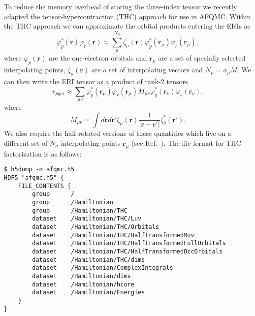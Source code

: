 To reduce the memory overhead of storing the three-index tensor we recently adapted the
tensor-hypercontraction\cite{HohensteinTHCI2012,ParrishTHCII2012,HohensteinTHCIII2012} (THC) approach for use in AFQMC\cite{MaloneISDF2019}. Within the THC approach we
can approximate the orbital products entering the ERIs as
\begin{equation}
    \varphi^{*}_p(\mathbf{r})\varphi_r(\mathbf{r}) \approx \sum_\mu^{N_\mu} \zeta_\mu(\mathbf{r}) \varphi^*_p(\mathbf{r}_\mu)\varphi_r(\mathbf{r}_\mu),\label{eq:orb_prod}
\end{equation}
where $\varphi_p(\mathbf{r})$ are the one-electron orbitals and $\mathbf{r}_\mu$ are a set of specially selected interpolating
points, $\zeta_\mu(\mathbf{r})$ are a set of interpolating vectors and $N_\mu = x_\mu M$. We can then write the ERI tensor as a
product of rank-2 tensors
\begin{equation}
    v_{pqrs} \approx \sum_{\mu\nu} \varphi^{*}_p(\mathbf{r}_\mu)\varphi_r(\mathbf{r}_\mu) M_{\mu\nu} \varphi^{*}_q(\mathbf{r}_\nu)\varphi_s(\mathbf{r}_\nu)\label{eq:4ix_thc},
\end{equation}
where
\begin{equation}
    M_{\mu\nu} = \int d\mathbf{r}d\mathbf{r}' \zeta_\mu(\mathbf{r})\frac{1}{|\mathbf{r}-\mathbf{r}'|}\zeta^{*}_\nu(\mathbf{r}')\label{eq:mmat}.
\end{equation}
We also require the half-rotated versions of these quantities which live on a different set of $\tilde{N}_\mu$ interpolating points $\tilde{\mathbf{r}}_\mu$ (see Ref.~\cite{MaloneISDF2019}).
The file format for THC factorization is as follows:
\begin{lstlisting}[style=SHELL,caption=Sample Sparse Cholesky QMCPACK Hamtiltonian.]
$ h5dump -n afqmc.h5
HDF5 "afqmc.h5" {
    FILE_CONTENTS {
        group      /
        group      /Hamiltonian
        group      /Hamiltonian/THC
        dataset    /Hamiltonian/THC/Luv
        dataset    /Hamiltonian/THC/Orbitals
        dataset    /Hamiltonian/THC/HalfTransformedMuv
        dataset    /Hamiltonian/THC/HalfTransformedFullOrbitals
        dataset    /Hamiltonian/THC/HalfTransformedOccOrbitals
        dataset    /Hamiltonian/THC/dims
        dataset    /Hamiltonian/ComplexIntegrals
        dataset    /Hamiltonian/dims
        dataset    /Hamiltonian/hcore
        dataset    /Hamiltonian/Energies
    }
}
\end{lstlisting}
